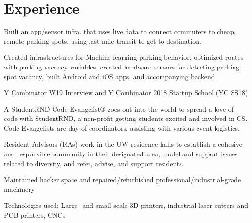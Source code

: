 \documentclass[]{deedy-resume-openfont}
\begin{document}
\section{Experience}
\hfill {}
\begin{tightemize}
	\item Built an app/sensor infra. that uses live data to connect commuters to cheap, remote parking spots, using last-mile transit to get to destination.
	\item Created infrastructures for Machine-learning parking behavior, optimized routes with parking vacancy variables, created hardware sensors for detecting parking spot vacancy, built Android and iOS apps, and accompanying backend
	\item Y Combinator W19 Interview and Y Combinator 2018 Startup School (YC SS18)
\end{tightemize}
\sectionsep
{}\hfill {}
\begin{tightemize}
	\item A StudentRND Code Evangelist® goes out into the world to spread a love of code with StudentRND, a non-profit getting students excited and involved in CS. Code Evangelists are day-of coordinators, assisting with various event logistics.
\end{tightemize}
\sectionsep
{}\hfill {}
\begin{tightemize}
	\item Resident Advisors (RAs) work in the UW residence halls to establish a cohesive and responsible community in their designated area, model and support issues related to diversity, and refer, advise, and support residents.
\end{tightemize}
\sectionsep
{}\hfill {}
\begin{tightemize}
	\item Maintained hacker space and repaired/refurbished professional/industrial-grade machinery
	\item Technologies used: Large- and small-scale 3D printers, industrial laser cutters and PCB printers, CNCs
\end{tightemize}
\sectionsep
%
%
\end{document}
